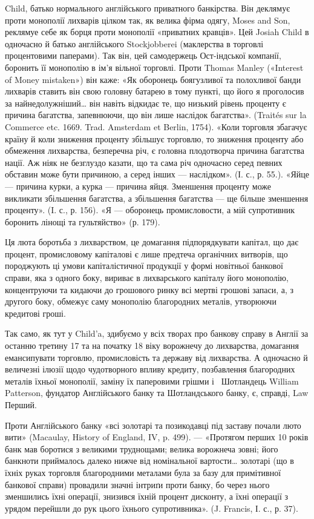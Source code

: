 \parcont{}  %
Child, батько нормального англійського приватного банкірства. Він деклямує
проти монополії лихварів цілком так, як велика фірма одягу, Moses and Son,
реклямуе себе як борця проти монополії «приватних кравців». Цей Josiah Child
в одночасно й батько англійського Stockjobberei (маклерства в торговлі процентовими
паперами). Так він, цей самодержець Ост-індської компанії, боронить її
монополію в ім’я вільної торговлі. Проти Thomas Manley («Interest of Money
mistaken») він каже: «Як оборонець боягузливої та полохливої банди лихварів
ставить він свою головну батарею в тому пункті, що його я проголосив за
найнедолужніший\dots{} він навіть відкидає те, що низький рівень проценту є причина
багатства, запевнюючи, що він лише наслідок багатства». (Traités sur la
Commerce etc. 1669. Trad. Amsterdam et Berlin, 1754). «Коли торговля збагачує
країну й коли зниження проценту збільшує торговлю, то зниження проценту
або обмеження лихварства, безперечна річ, є головна плодотворча причина багатства
нації. Аж ніяк не безглуздо казати, що та сама річ одночасно серед певних
обставин може бути причиною, а серед інших — наслідком». (І. с., р. 55.). «Яйце —
причина курки, а курка — причина яйця. Зменшення проценту може викликати
збільшення багатства, а збільшення багатства — ще більше зменшення проценту».
(I. с., р. 156). «Я — оборонець промисловости, а мій супротивник боронить
лінощі та гультяйство» (р. 179).

Ця люта боротьба з лихварством, це домагання підпорядкувати капітал, що
дає процент, промисловому капіталові є лише предтеча органічних витворів, що
породжують ці умови капіталістичної продукції у формі новітньої банкової справи,
яка з одного боку, вириває в лихварського капіталу його монополію, концентруючи
та кидаючи до грошового ринку всі мертві грошові запаси, а, з другого
боку, обмежує саму монополію благородних металів, утворюючи кредитові гроші.

Так само, як тут у Child’a, здибуємо у всіх творах про банкову справу
в Англії за останню третину 17 та на початку 18 віку ворожнечу до лихварства,
домагання емансипувати торговлю, промисловість та державу від лихварства.
А одночасно й величезні ілюзії щодо чудотворного впливу кредиту, позбавлення
благородних металів їхньої монополії, заміну їх паперовими грішми
і~ Шотландець William Patterson, фундатор Англійського банку та Шотландського
банку, є, справді, Law Перший.

Проти Англійського банку «всі золотарі та позикодавці під заставу почали
люто вити» (Macaulay, History of England, IV, p. 499). — «Протягом перших
10 років банк мав боротися з великими труднощами; велика ворожнеча
зовні; його банкноти приймалось далеко нижче від номінальної вартости\dots{} золотарі
(що в їхніх руках торговля благородними металами була за базу для
примітивної банкової справи) провадили значні інтриґи проти банку, бо через
нього зменшились їхні операції, знизився їхній процент дисконту, а їхні
операції з урядом перейшли до рук цього їхнього супротивника». (J. Francis,
І. с., р. 37).


